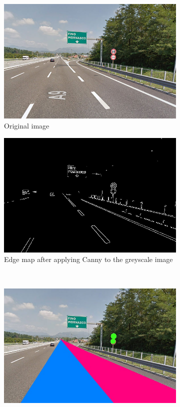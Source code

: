 \documentclass[twoside,onecolumn]{article}
\theoremstyle{definition}
\begin{document}
\begin{figure} \centering
\begin{subfigure}{0.45\textwidth}
  \includegraphics[width=\textwidth]{../images/road4.jpg}
\caption{Original image }\label{fig:r4fig}
\end{subfigure} \quad
\begin{subfigure}{0.45\textwidth}
\includegraphics[width=\textwidth]{../results/edgeMap_road4.jpg}
\caption{Edge map after applying Canny to the greyscale image}\label{fig:r4edges}
\end{subfigure}\\
  \begin{subfigure}{0.6\textwidth}
\includegraphics[width=\textwidth]{../results/Circles_road4.jpg}

\end{subfigure}
\end{figure}
\end{document}
